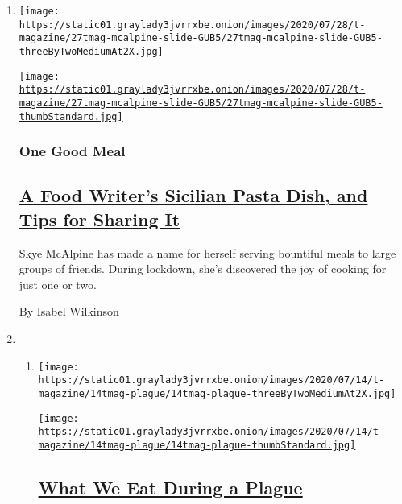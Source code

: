 \begin{enumerate}
\def\labelenumi{\arabic{enumi}.}
\item
  \texttt{[image: https://static01.graylady3jvrrxbe.onion/images/2020/07/28/t-magazine/27tmag-mcalpine-slide-GUB5/27tmag-mcalpine-slide-GUB5-threeByTwoMediumAt2X.jpg]}

  \href{/2020/07/29/t-magazine/skye-mcalpine-pasta-cooking.html}{\texttt{[image: https://static01.graylady3jvrrxbe.onion/images/2020/07/28/t-magazine/27tmag-mcalpine-slide-GUB5/27tmag-mcalpine-slide-GUB5-thumbStandard.jpg]}}

  \hypertarget{one-good-meal}{%
  \subsubsection{One Good Meal}\label{one-good-meal}}

  \hypertarget{a-food-writers-sicilian-pasta-dish-and-tips-for-sharing-it}{%
  \subsection{\texorpdfstring{\href{/2020/07/29/t-magazine/skye-mcalpine-pasta-cooking.html}{A
  Food Writer's Sicilian Pasta Dish, and Tips for Sharing
  It}}{A Food Writer's Sicilian Pasta Dish, and Tips for Sharing It}}\label{a-food-writers-sicilian-pasta-dish-and-tips-for-sharing-it}}

  Skye McAlpine has made a name for herself serving bountiful meals to
  large groups of friends. During lockdown, she's discovered the joy of
  cooking for just one or two.

  By Isabel Wilkinson
\item
  \begin{enumerate}
  \def\labelenumii{\arabic{enumii}.}
  \item
    \texttt{[image: https://static01.graylady3jvrrxbe.onion/images/2020/07/14/t-magazine/14tmag-plague/14tmag-plague-threeByTwoMediumAt2X.jpg]}

    \href{/2020/07/16/t-magazine/eating-food-during-plague.html}{\texttt{[image: https://static01.graylady3jvrrxbe.onion/images/2020/07/14/t-magazine/14tmag-plague/14tmag-plague-thumbStandard.jpg]}}

    \hypertarget{what-we-eat-during-a-plague}{%
    \subsection{\texorpdfstring{\href{/2020/07/16/t-magazine/eating-food-during-plague.html}{What
    We Eat During a
    Plague}}{What We Eat During a Plague}}\label{what-we-eat-during-a-plague}}


\end{enumerate}
\end{enumerate}
